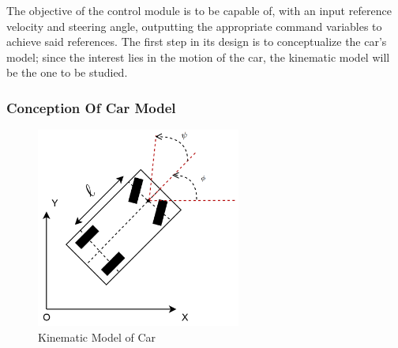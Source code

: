 The objective of the control module is to be capable of, with an input reference velocity and steering angle, outputting the appropriate command variables to achieve said references. The first step in its design is to conceptualize the car's model; since the interest lies in the motion of the car, the kinematic model will be the one to be studied.
\subsubsection{Conception Of Car Model}
\label{sec:concep}

\begin{figure}[!htbp]
\centering
       \includegraphics[page=1,width=0.6\textwidth]{img/kinematicModel.png} 
\caption{Kinematic Model of Car}
\label{fig:kinModel}
\end{figure}

